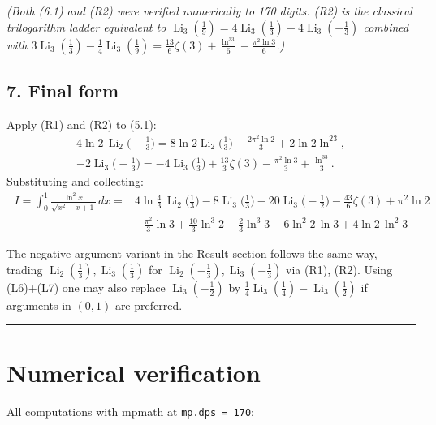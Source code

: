 \documentclass[11pt]{article}
\theoremstyle{remark}
\begin{document}
\textit{(Both (6.1) and (R2) were verified numerically to 170 digits. (R2) is the classical trilogarithm ladder equivalent to $\operatorname{Li}_3(\frac19)=4\operatorname{Li}_3(\frac13)+4\operatorname{Li}_3(-\frac13)$ combined with $3\operatorname{Li}_3(\frac13)-\frac14\operatorname{Li}_3(\frac19)=\frac{13}{6}\zeta(3)+\frac{\ln^33}{6}-\frac{\pi^2\ln3}{6}$.)}

\subsection*{7. Final form}

Apply (R1) and (R2) to (5.1):
\[
\begin{gathered}
4\ln2\,\operatorname{Li}_2\!\Big(-\frac13\Big)=8\ln2\operatorname{Li}_2\!\Big(\frac13\Big)-\frac{2\pi^2\ln2}{3}+2\ln2\ln^23,\\
-2\operatorname{Li}_3\!\Big(-\frac13\Big)=-4\operatorname{Li}_3\!\Big(\frac13\Big)+\frac{13}{3}\zeta(3)-\frac{\pi^2\ln3}{3}+\frac{\ln^33}{3}.
\end{gathered}
\]
Substituting and collecting:
\[
\boxed{\;
\begin{aligned}
I=\int_0^1\frac{\ln^2x}{\sqrt{x^2-x+1}}\,dx
={}&4\ln\tfrac43\,\operatorname{Li}_2\!\Big(\tfrac13\Big)-8\operatorname{Li}_3\!\Big(\tfrac13\Big)-20\operatorname{Li}_3\!\Big(-\tfrac12\Big)
-\frac{43}{6}\zeta(3)+\pi^{2}\ln2\\
&-\frac{\pi^{2}}{3}\ln3+\frac{10}{3}\ln^{3}2-\frac{2}{3}\ln^{3}3-6\ln^{2}2\,\ln3+4\ln2\,\ln^{2}3\;
\end{aligned}}
\]

The negative-argument variant in the Result section follows the same way, trading $\operatorname{Li}_2(\frac13),\operatorname{Li}_3(\frac13)$ for $\operatorname{Li}_2(-\frac13),\operatorname{Li}_3(-\frac13)$ via (R1), (R2). Using (L6)+(L7) one may also replace $\operatorname{Li}_3(-\frac12)$ by $\frac14\operatorname{Li}_3(\frac14)-\operatorname{Li}_3(\frac12)$ if arguments in $(0,1)$ are preferred.

\begin{center}\rule{0.5\textwidth}{0.4pt}\end{center}

\section*{Numerical verification}

All computations with mpmath at \texttt{mp.dps = 170}:
\end{document}
